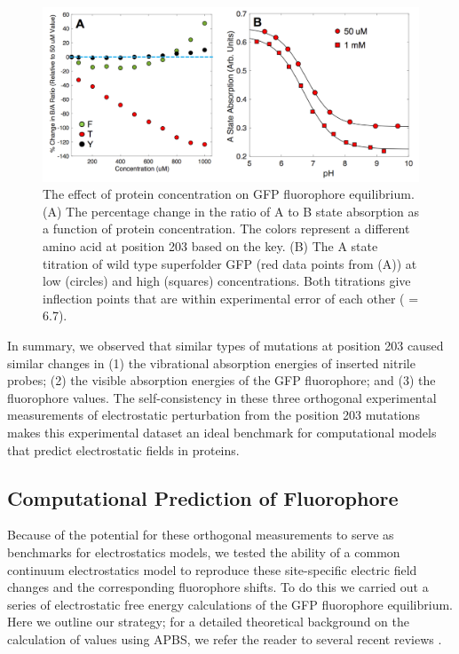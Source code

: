 \begin{figure}
    \center
    \includegraphics[width=\double]{figures-gfp-pKa/concentration_dependence.png}
    \caption[Effect of protein concentration on GFP fluorophore equilibrium]{
        The effect of protein concentration on GFP fluorophore equilibrium. 
        (A) The percentage change in the ratio of A to B state absorption as a function of protein concentration. 
        The colors represent a different amino acid at position 203 based on the key. 
        (B) The A state titration of wild type superfolder GFP (red data points from (A)) at low (circles) and high (squares) concentrations. 
        Both titrations give inflection points that are within experimental error of each other (\pKa{} = 6.7).
    }
    \label{fig:conc_depend}
\end{figure}

In summary, we observed that similar types of mutations at position 203 caused similar changes in (1) the vibrational absorption energies of inserted nitrile probes; (2) the visible absorption energies of the GFP fluorophore; and (3) the fluorophore \pKa{} values.
The self-consistency in these three orthogonal experimental measurements of electrostatic perturbation from the position 203 mutations makes this experimental dataset an ideal benchmark for computational models that predict electrostatic fields in proteins.

\subsection{Computational Prediction of Fluorophore \pKa{} }

Because of the potential for these orthogonal measurements to serve as benchmarks for electrostatics models, we tested the ability of a common continuum electrostatics model to reproduce these site-specific electric field changes and the corresponding fluorophore \pKa{} shifts.
To do this we carried out a series of electrostatic free energy calculations of the GFP fluorophore equilibrium.
Here we outline our strategy; for a detailed theoretical background on the calculation of \pKa{} values using APBS, we refer the reader to several recent reviews \cite{Baker2005, Baker2004, Baker2001, Wagoner2004, Unni2011}.

